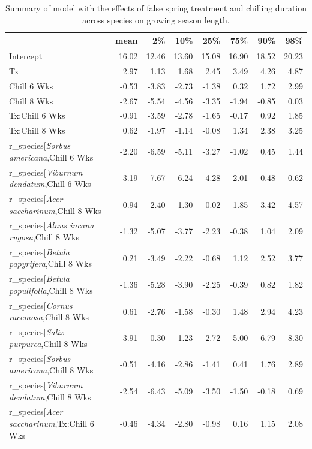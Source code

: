 \documentclass{article}\usepackage[]{graphicx}\usepackage[]{color}
\begin{document}
\begin{longtable}{lrrrrrrr}
\caption{Summary of model with the effects of false spring treatment and chilling duration across species on growing season length.} \\ 
  \hline
 & mean & 2\% & 10\% & 25\% & 75\% & 90\% & 98\% \\ 
  \hline \endhead  \hline
Intercept & 16.02 & 12.46 & 13.60 & 15.08 & 16.90 & 18.52 & 20.23 \\ 
  Tx & 2.97 & 1.13 & 1.68 & 2.45 & 3.49 & 4.26 & 4.87 \\ 
  Chill 6 Wks & -0.53 & -3.83 & -2.73 & -1.38 & 0.32 & 1.72 & 2.99 \\ 
  Chill 8 Wks & -2.67 & -5.54 & -4.56 & -3.35 & -1.94 & -0.85 & 0.03 \\ 
  Tx:Chill 6 Wks & -0.91 & -3.59 & -2.78 & -1.65 & -0.17 & 0.92 & 1.85 \\ 
  Tx:Chill 8 Wks & 0.62 & -1.97 & -1.14 & -0.08 & 1.34 & 2.38 & 3.25 \\ 
  r_species[\textit{Sorbus americana},Chill 6 Wks & -2.20 & -6.59 & -5.11 & -3.27 & -1.02 & 0.45 & 1.44 \\ 
  r_species[\textit{Viburnum dendatum},Chill 6 Wks & -3.19 & -7.67 & -6.24 & -4.28 & -2.01 & -0.48 & 0.62 \\ 
  r_species[\textit{Acer saccharinum},Chill 8 Wks & 0.94 & -2.40 & -1.30 & -0.02 & 1.85 & 3.42 & 4.57 \\ 
  r_species[\textit{Alnus incana rugosa},Chill 8 Wks & -1.32 & -5.07 & -3.77 & -2.23 & -0.38 & 1.04 & 2.09 \\ 
  r_species[\textit{Betula papyrifera},Chill 8 Wks & 0.21 & -3.49 & -2.22 & -0.68 & 1.12 & 2.52 & 3.77 \\ 
  r_species[\textit{Betula populifolia},Chill 8 Wks & -1.36 & -5.28 & -3.90 & -2.25 & -0.39 & 0.82 & 1.82 \\ 
  r_species[\textit{Cornus racemosa},Chill 8 Wks & 0.61 & -2.76 & -1.58 & -0.30 & 1.48 & 2.94 & 4.23 \\ 
  r_species[\textit{Salix purpurea},Chill 8 Wks & 3.91 & 0.30 & 1.23 & 2.72 & 5.00 & 6.79 & 8.30 \\ 
  r_species[\textit{Sorbus americana},Chill 8 Wks & -0.51 & -4.16 & -2.86 & -1.41 & 0.41 & 1.76 & 2.89 \\ 
  r_species[\textit{Viburnum dendatum},Chill 8 Wks & -2.54 & -6.43 & -5.09 & -3.50 & -1.50 & -0.18 & 0.69 \\ 
  r_species[\textit{Acer saccharinum},Tx:Chill 6 Wks & -0.46 & -4.34 & -2.80 & -0.98 & 0.16 & 1.15 & 2.08 \\ 

\end{longtable}
\end{document}
